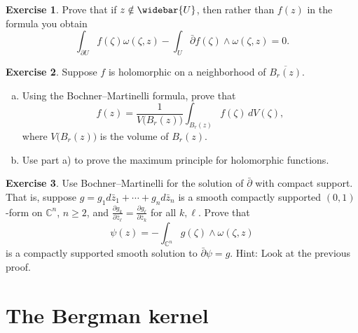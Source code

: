 \documentclass[12pt,openany]{book}
\newcommand{\C}{{\mathbb{C}}}
\theoremstyle{plain}
\theoremstyle{remark}
\theoremstyle{definition}
\newenvironment{exbox}{%
    \def\FrameCommand{\vrule width 1pt \relax\hspace{10pt}}%
    \MakeFramed{\advance\hsize-\width\FrameRestore}%
}{%
    \endMakeFramed
}
\newenvironment{exparts}{%
    \leavevmode\begin{enumerate}[a),noitemsep,topsep=0pt,parsep=0pt,partopsep=0pt]
}{%
    \end{enumerate}
}
\theoremstyle{exercise}
\newtheorem{exercise}{Exercise}[section]
\theoremstyle{example}
\begin{document}
\begin{exbox}
\begin{exercise}
Prove that if $z \notin \widebar{U}$, then rather than $f(z)$ in the
formula you obtain
\begin{equation*}
\int_{\partial U}
f(\zeta) \omega(\zeta,z)
-
\int_{U}
\bar{\partial} f(\zeta) \wedge \omega(\zeta,z) = 0 .
\end{equation*}
\end{exercise}

\begin{exercise}
Suppose $f$ is holomorphic on a neighborhood of
$\overline{B_r(z)}$.
\begin{exparts}
\item
Using the Bochner--Martinelli formula, prove that
\begin{equation*}
f(z) = \frac{1}{V\bigl(B_r(z)\bigr)} \int_{B_r(z)} f(\zeta) \, dV(\zeta) ,
\end{equation*}
where $V\bigl(B_r(z)\bigr)$ is the volume of $B_r(z)$.
\item
Use part a) to prove the maximum principle for holomorphic functions.
\end{exparts}
\end{exercise}

\begin{exercise}
Use Bochner--Martinelli for the solution of $\bar{\partial}$ with compact
support.  That is, suppose $g = g_1 d\bar{z}_1 + \cdots + g_n d\bar{z}_n$
is a smooth compactly supported $(0,1)$-form
on $\C^n$, $n \geq 2$, and
$\frac{\partial g_k}{\partial \bar{z}_\ell} =
\frac{\partial g_\ell}{\partial \bar{z}_k}$ for all $k, \ell$.
Prove that
\begin{equation*}
\psi(z) = - \int_{\C^n} g(\zeta) \wedge \omega(\zeta,z)
\end{equation*}
is a compactly supported smooth solution to $\bar{\partial} \psi = g$.
Hint: Look at the previous proof.
\end{exercise}
\end{exbox}


\section{The Bergman kernel}
\end{document}
